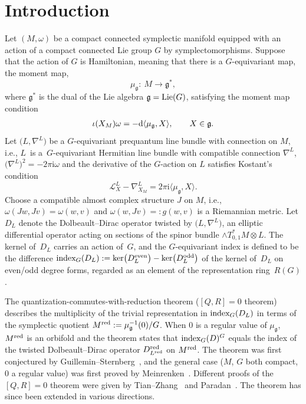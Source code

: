 \documentclass[pdftex]{sigma}
\numberwithin{equation}{section}
\newcommand{\pair}[2]{\langle #1, #2 \rangle}
\newcommand{\tn}[1]{\textnormal{#1}}
\renewcommand{\i}{{\mathrm{i}}}
\def\g{\ensuremath{\mathfrak{g}}}
\def\L{\ensuremath{\mathcal{L}}}
\def\ker{\ensuremath{\textnormal{ker}}}
\def\index{\ensuremath{\textnormal{index}}}
\begin{document}
\section{Introduction}
Let $(M,\omega)$ be a compact connected symplectic manifold equipped with an action of a compact connected Lie group $G$ by symplectomorphisms. Suppose that the action of $G$ is Hamiltonian, meaning that there is a $G$-equivariant map, the moment map,
\[ \mu_\g \colon \ M \rightarrow \g^\ast,\]
where $\g^\ast$ is the dual of the Lie algebra $\g=\tn{Lie}(G)$, satisfying the moment map condition
\begin{gather}\label{eqn:mm}
\iota(X_M)\omega=-{\rm d}\pair{\mu_\g}{X}, \qquad X \in \g.
\end{gather}
Let $\big(L,\nabla^L\big)$ be a $G$-equivariant prequantum line bundle with connection on $M$, i.e., $L$~is a~$G$-equivariant Hermitian line bundle with compatible connection $\nabla^L$, $\big(\nabla^L\big)^2=-2\pi \i \omega$ and the derivative of the $G$-action on $L$ satisfies Kostant's condition
\[ \L^L_X-\nabla^L_{X_M}=2\pi \i\pair{\mu_\g}{X}.\]
Choose a compatible almost complex structure $J$ on $M$, i.e., $\omega(Jw,Jv)=\omega(w,v)$ and $\omega(w,Jv)\allowbreak =:g(w,v)$ is a Riemannian metric. Let $D_L$ denote the Dolbeault--Dirac operator twisted by $\big(L,\nabla^L\big)$, an elliptic differential operator acting on sections of the spinor bundle $\wedge T^\ast_{0,1}M\otimes L$. The kernel of~$D_L$ carries an action of~$G$, and the $G$-equivariant index is defined to be the difference $\index_G(D_L):=\ker\big(D_L^{\tn{even}}\big)-\ker\big(D_L^{\tn{odd}}\big)$ of the kernel of~$D_L$ on even/odd degree forms, regarded as an element of the representation ring~$R(G)$.

The quantization-commutes-with-reduction theorem ($[Q,R]=0$ theorem) describes the multiplicity of the trivial representation in $\index_G(D_L)$ in terms of the symplectic quotient $M^{\tn{red}}:=\mu_\g^{-1}(0)/G$. When $0$ is a regular value of $\mu_\g$, $M^{\tn{red}}$ is an orbifold and the theorem states that $\index_G(D)^G$ equals the index of the twisted Dolbeault--Dirac operator $D^{\tn{red}}_{L^{\tn{red}}}$ on $M^{\tn{red}}$. The theorem was first conjectured by Guillemin--Sternberg~\cite{GuilleminSternbergConjecture}, and the general case ($M$, $G$ both compact, $0$ a regular value) was first proved by Meinrenken~\cite{MeinrenkenSymplecticSurgery}. Different proofs of the $[Q,R]=0$ theorem were given by Tian--Zhang~\cite{TianZhang} and Paradan~\cite{ParadanRiemannRoch}. The theorem has since been extended in various directions.
\end{document}
